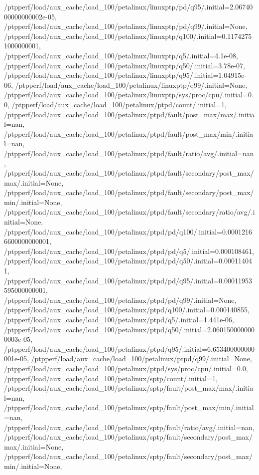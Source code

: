 {    /ptpperf/load/aux_cache/load_100/petalinux/linuxptp/pd/q95/.initial=2.0674000000000002e-05,
    /ptpperf/load/aux_cache/load_100/petalinux/linuxptp/pd/q99/.initial=None,
    /ptpperf/load/aux_cache/load_100/petalinux/linuxptp/q100/.initial=0.11742751000000001,
    /ptpperf/load/aux_cache/load_100/petalinux/linuxptp/q5/.initial=4.1e-08,
    /ptpperf/load/aux_cache/load_100/petalinux/linuxptp/q50/.initial=3.78e-07,
    /ptpperf/load/aux_cache/load_100/petalinux/linuxptp/q95/.initial=1.04915e-06,
    /ptpperf/load/aux_cache/load_100/petalinux/linuxptp/q99/.initial=None,
    /ptpperf/load/aux_cache/load_100/petalinux/linuxptp/sys/proc/cpu/.initial=0.0,
    /ptpperf/load/aux_cache/load_100/petalinux/ptpd/count/.initial=1,
    /ptpperf/load/aux_cache/load_100/petalinux/ptpd/fault/post_max/max/.initial=nan,
    /ptpperf/load/aux_cache/load_100/petalinux/ptpd/fault/post_max/min/.initial=nan,
    /ptpperf/load/aux_cache/load_100/petalinux/ptpd/fault/ratio/avg/.initial=nan,
    /ptpperf/load/aux_cache/load_100/petalinux/ptpd/fault/secondary/post_max/max/.initial=None,
    /ptpperf/load/aux_cache/load_100/petalinux/ptpd/fault/secondary/post_max/min/.initial=None,
    /ptpperf/load/aux_cache/load_100/petalinux/ptpd/fault/secondary/ratio/avg/.initial=None,
    /ptpperf/load/aux_cache/load_100/petalinux/ptpd/pd/q100/.initial=0.00012166600000000001,
    /ptpperf/load/aux_cache/load_100/petalinux/ptpd/pd/q5/.initial=0.000108461,
    /ptpperf/load/aux_cache/load_100/petalinux/ptpd/pd/q50/.initial=0.000114041,
    /ptpperf/load/aux_cache/load_100/petalinux/ptpd/pd/q95/.initial=0.00011953595000000001,
    /ptpperf/load/aux_cache/load_100/petalinux/ptpd/pd/q99/.initial=None,
    /ptpperf/load/aux_cache/load_100/petalinux/ptpd/q100/.initial=0.000140855,
    /ptpperf/load/aux_cache/load_100/petalinux/ptpd/q5/.initial=1.441e-06,
    /ptpperf/load/aux_cache/load_100/petalinux/ptpd/q50/.initial=2.0601500000000003e-05,
    /ptpperf/load/aux_cache/load_100/petalinux/ptpd/q95/.initial=6.653400000000001e-05,
    /ptpperf/load/aux_cache/load_100/petalinux/ptpd/q99/.initial=None,
    /ptpperf/load/aux_cache/load_100/petalinux/ptpd/sys/proc/cpu/.initial=0.0,
    /ptpperf/load/aux_cache/load_100/petalinux/sptp/count/.initial=1,
    /ptpperf/load/aux_cache/load_100/petalinux/sptp/fault/post_max/max/.initial=nan,
    /ptpperf/load/aux_cache/load_100/petalinux/sptp/fault/post_max/min/.initial=nan,
    /ptpperf/load/aux_cache/load_100/petalinux/sptp/fault/ratio/avg/.initial=nan,
    /ptpperf/load/aux_cache/load_100/petalinux/sptp/fault/secondary/post_max/max/.initial=None,
    /ptpperf/load/aux_cache/load_100/petalinux/sptp/fault/secondary/post_max/min/.initial=None,
}
